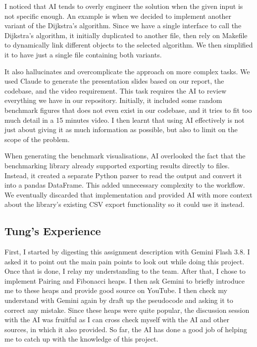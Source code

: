 I noticed that AI tends to overly engineer the solution when the given input is
not specific enough. An example is when we decided to implement another variant
of the Dijkstra's algorithm. Since we have a single interface to call the
Dijkstra's algorithm, it initially duplicated to another file, then rely on
Makefile to dynamically link different objects to the selected algorithm. We
then simplified it to have just a single file containing both variants.

It also hallucinates and overcomplicate the approach on more complex tasks. We
used Claude to generate the presentation slides based on our report, the
codebase, and the video requirement. This task requires the AI to review
everything we have in our repository. Initially, it included some random
benchmark figures that does not even exist in our codebase, and it tries to fit
too much detail in a 15 minutes video. I then learnt that using AI effectively
is not just about giving it as much information as possible, but also to limit
on the scope of the problem.

When generating the benchmark visualisations, AI overlooked the fact that the
benchmarking library already supported exporting results directly to 
files. Instead, it created a separate Python parser to read the output and
convert it into a pandas DataFrame. This added unnecessary complexity to the
workflow. We eventually discarded that implementation and provided AI with more
context about the library's existing CSV export functionality so it could use it
instead.

\subsection{Tung's Experience}

First, I started by digesting this assignment description with Gemini Flash 3.8.
I asked it to point out the main pain points to look out while doing this
project. Once that is done, I relay my understanding to the team. After that, I
chose to implement Pairing and Fibonacci heaps. I then ask Gemini to briefly
introduce me to these heaps and provide good source on YouTube. I then check my
understand with Gemini again by draft up the pseudocode and asking it to correct
any mistake. Since these heaps were quite popular, the discussion session with
the AI was fruitful as I can cross check myself with the AI and other sources,
in which it also provided. So far, the AI has done a good job of helping me to
catch up with the knowledge of this project.

